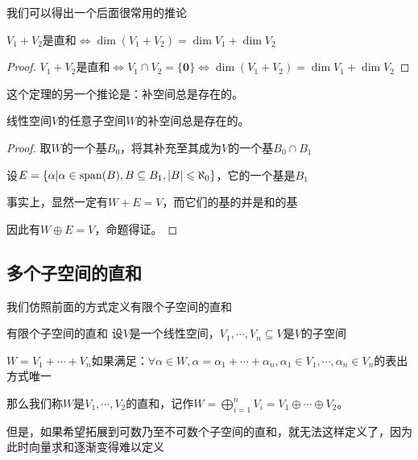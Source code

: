 \documentclass[12pt, a4paper, oneside, UTF8]{ctexbook}
\begin{document}
			我们可以得出一个后面很常用的推论
			\begin{corollary}{}{}
				$V_1+V_2$是直和$\Leftrightarrow \dim (V_1+V_2) = \dim V_1 +\dim V_2$
			\end{corollary}
			\begin{proof}
				$V_1+V_2$是直和$\Leftrightarrow V_1 \cap V_2 = \{\mathbf{0}\} \Leftrightarrow \dim (V_1+V_2) = \dim V_1 +\dim V_2$
			\end{proof}
			这个定理的另一个推论是：补空间总是存在的。
			\begin{corollary}{}{}
				线性空间$V$的任意子空间$W$的补空间总是存在的。
			\end{corollary}
			\begin{proof}
				取$W$的一个基$B_0$，将其补充至其成为$V$的一个基$B_0 \cap B_1$

				设$E = \{\alpha | \alpha \in \operatorname{span}(B),B \subseteq B_1,|B| \leqslant \aleph_0\}$，它的一个基是$B_1$

				事实上，显然一定有$W+E=V$，而它们的基的并是和的基

				因此有$W \oplus E = V$，命题得证。
			\end{proof}
		\subsection{多个子空间的直和}
			我们仿照前面的方式定义有限个子空间的直和
			\begin{defn}{有限个子空间的直和}{}
				设$V$是一个线性空间，$V_1,\cdots,V_n \subseteq V$是$V$的子空间

				$W=V_1+\cdots+V_n$如果满足：$\forall \alpha \in W,\alpha =\alpha_1+\cdots+\alpha_n,\alpha_1 \in V_1,\cdots,\alpha_n \in V_n$的表出方式唯一

				那么我们称$W$是$V_1,\cdots,V_2$的直和，记作$W=\bigoplus_{i=1}^{n} V_i = V_1 \oplus \cdots \oplus V_2$。
			\end{defn}
			但是，如果希望拓展到可数乃至不可数个子空间的直和，就无法这样定义了，因为此时向量求和逐渐变得难以定义
\end{document}
